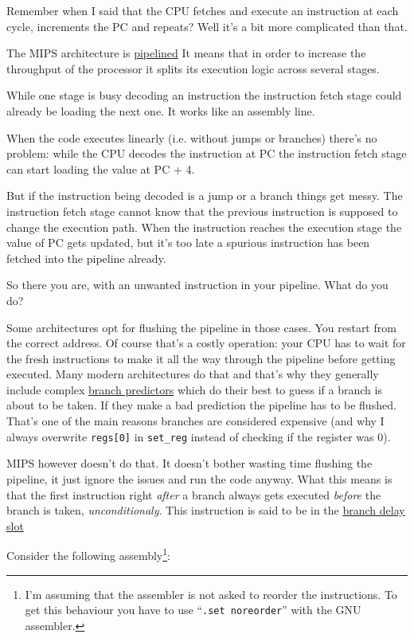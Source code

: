\documentclass[a4paper]{article}
\newcommand{\code}[1] {\texttt{#1}}
\begin{document}
Remember when I said that the CPU fetches and execute an instruction
at each cycle, increments the PC and repeats? Well it's a bit more
complicated than that.

The MIPS architecture is
\href{https://en.wikipedia.org/wiki/Classic_RISC_pipeline}{pipelined}
It means that in order to increase the throughput of the processor it
splits its execution logic across several stages.

While one stage is busy decoding an instruction the instruction fetch
stage could already be loading the next one. It works like an assembly
line.

When the code executes linearly (i.e. without jumps or branches)
there's no problem: while the CPU decodes the instruction at PC the
instruction fetch stage can start loading the value at PC + 4.

But if the instruction being decoded is a jump or a branch things get
messy. The instruction fetch stage cannot know that the previous
instruction is supposed to change the execution path. When the
instruction reaches the execution stage the value of PC gets updated,
but it's too late a spurious instruction has been fetched into the
pipeline already.

So there you are, with an unwanted instruction in your pipeline. What
do you do?

Some architectures opt for flushing the pipeline in those cases. You
restart from the correct address. Of course that's a costly operation:
your CPU has to wait for the fresh instructions to make it all the way
through the pipeline before getting executed. Many modern
architectures do that and that's why they generally include complex
\href{https://en.wikipedia.org/wiki/Branch_predictor}{branch
  predictors} which do their best to guess if a branch is about to be
taken. If they make a bad prediction the pipeline has to be
flushed. That's one of the main reasons branches are considered
expensive (and why I always overwrite \code{regs[0]} in
\code{set\_reg} instead of checking if the register was 0).

MIPS however doesn't do that. It doesn't bother wasting time flushing
the pipeline, it just ignore the issues and run the code anyway. What
this means is that the first instruction right \emph{after} a branch
always gets executed \emph{before} the branch is taken,
\emph{unconditionaly}. This instruction is said to be in the
\href{https://en.wikipedia.org/wiki/Delay_slot}{branch delay slot}

Consider the following assembly\footnote{I'm assuming that
  the assembler is not asked to reorder the instructions. To get this
  behaviour you have to use ``\code{.set noreorder}'' with the GNU
  assembler.}:
\end{document}
